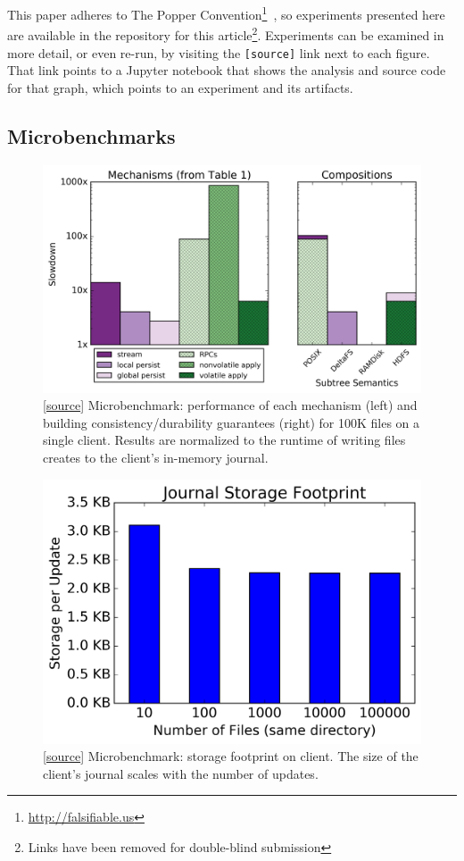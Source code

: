 This paper adheres to The Popper
Convention\footnote{\url{http://falsifiable.us}}~\cite{jimenez_popper_2016}, so
experiments presented here are available in the repository for this
article\footnote{Links have been removed for double-blind submission}.
Experiments can be examined in more detail, or even re-run, by visiting the
\texttt{[source]} link next to each figure. That link points to a Jupyter
notebook that shows the analysis and source code for that graph, which points
to an experiment and its artifacts.

\subsection{Microbenchmarks}
\label{sec:microbenchmarks}
\begin{figure}[tb]
\centering
\includegraphics[width=1.0\linewidth]{graphs/composable-mechanisms.png}
\caption{ [\href{https://...}{source}] Microbenchmark: performance of each
mechanism (left) and building consistency/durability guarantees (right) for
100K files on a single client. Results are normalized to the runtime of writing
files creates to the client's in-memory journal.
\label{fig:composable-mechanisms}}
\end{figure}

\begin{figure}[tb]
\centering
\includegraphics[width=1.0\linewidth]{graphs/behavior-journal-size.png}
\caption{ [\href{https://...}{source}] Microbenchmark: storage footprint on
client. The size of the client's journal scales with the number of
updates.\label{fig:behavior-journal-size}}
\end{figure}

